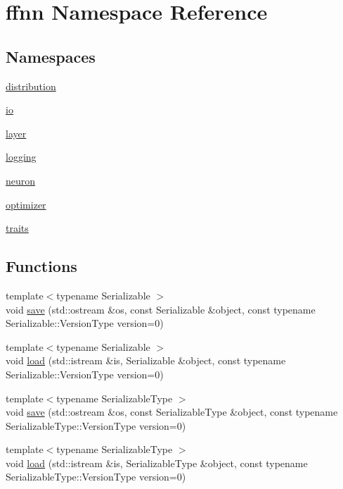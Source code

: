 \hypertarget{namespaceffnn}{\section{ffnn Namespace Reference}
\label{namespaceffnn}
}
\subsection*{Namespaces}
\begin{DoxyCompactItemize}
\item 
\hyperlink{namespaceffnn_1_1distribution}{distribution}
\item 
\hyperlink{namespaceffnn_1_1io}{io}
\item 
\hyperlink{namespaceffnn_1_1layer}{layer}
\item 
\hyperlink{namespaceffnn_1_1logging}{logging}
\item 
\hyperlink{namespaceffnn_1_1neuron}{neuron}
\item 
\hyperlink{namespaceffnn_1_1optimizer}{optimizer}
\item 
\hyperlink{namespaceffnn_1_1traits}{traits}
\end{DoxyCompactItemize}
\subsection*{Functions}
\begin{DoxyCompactItemize}
\item 
{\footnotesize template$<$typename Serializable $>$ }\\void \hyperlink{namespaceffnn_a1d292f830b9e27ce3965b0c18231b7fc}{save} (std\-::ostream \&os, const Serializable \&object, const typename Serializable\-::\-Version\-Type version=0)
\item 
{\footnotesize template$<$typename Serializable $>$ }\\void \hyperlink{namespaceffnn_a365753310c86d8142fa5b785cc16004a}{load} (std\-::istream \&is, Serializable \&object, const typename Serializable\-::\-Version\-Type version=0)
\item 
{\footnotesize template$<$typename Serializable\-Type $>$ }\\void \hyperlink{namespaceffnn_a25c692ab6bf9799deb7c4282ee85bdd6}{save} (std\-::ostream \&os, const Serializable\-Type \&object, const typename Serializable\-Type\-::\-Version\-Type version=0)
\item 
{\footnotesize template$<$typename Serializable\-Type $>$ }\\void \hyperlink{namespaceffnn_a94ff5b786bc42fa02bcf27ed86854a71}{load} (std\-::istream \&is, Serializable\-Type \&object, const typename Serializable\-Type\-::\-Version\-Type version=0)
\end{DoxyCompactItemize}


